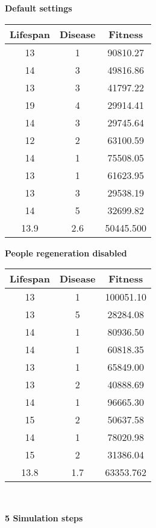 \documentclass[conference,compsoc]{IEEEtran}
\begin{document}
\begin{table}[!t]
\begin{center}
\begin{minipage}{0.25\textwidth}
\centering
\textbf{Default settings}\\
	\begin{tabular}{|c|c|c|}
	\hline
	Lifespan & Disease & Fitness\\
	\hline
	13 & 1 & 90810.27\\
	14 & 3 & 49816.86\\
	13 & 3 & 41797.22\\
	19 & 4 & 29914.41\\
	14 & 3 & 29745.64\\
	12 & 2 & 63100.59\\
	14 & 1 & 75508.05\\
	13 & 1 & 61623.95\\
	13 & 3 & 29538.19\\
	14 & 5 & 32699.82\\
	\hline
	13.9 & 2.6 & 50445.500\\
	\hline
	\end{tabular}
\end{minipage}%
\begin{minipage}{0.25\textwidth}
\centering
\textbf{People regeneration disabled}\\
	\begin{tabular}{|c|c|c|}
	\hline
	Lifespan & Disease & Fitness\\
	\hline
	13 & 1 & 100051.10\\
	13 & 5 &  28284.08\\
	14 & 1 &  80936.50\\
	14 & 1 &  60818.35\\
	13 & 1 &  65849.00\\
	13 & 2 &  40888.69\\
	14 & 1 &  96665.30\\
	15 & 2 &  50637.58\\
	14 & 1 &  78020.98\\
	15 & 2 &  31386.04\\
	\hline
	13.8 & 1.7 & 63353.762\\
	\hline
	\end{tabular}
\end{minipage}%
\\[3ex]
\begin{minipage}{0.25\textwidth}
\centering
\textbf{5 Simulation steps}\\
	\begin{tabular}{|c|c|c|}

\end{tabular}
\end{minipage}
\end{center}
\end{table}
\end{document}
